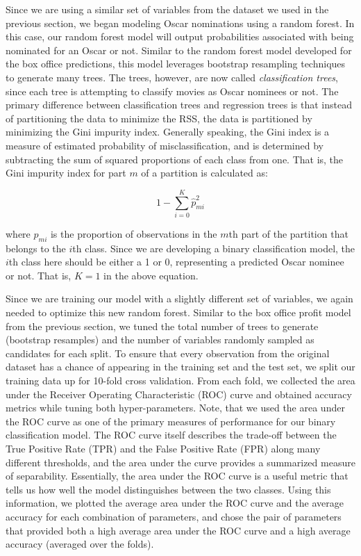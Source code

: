 \documentclass[10pt]{article}
\begin{document}
Since we are using a similar set of variables from the dataset we used in the previous section, we began modeling Oscar nominations using a random forest. In this case, our random forest model will output probabilities associated with being nominated for an Oscar or not. Similar to the random forest model developed for the box office predictions, this model leverages bootstrap resampling techniques to generate many trees. The trees, however, are now called \textit{classification trees}, since each tree is attempting to classify movies as Oscar nominees or not. The primary difference between classification trees and regression trees is that instead of partitioning the data to minimize the RSS, the data is partitioned by minimizing the Gini impurity index. Generally speaking, the Gini index is a measure of estimated probability of misclassification, and is determined by subtracting the sum of squared proportions of each class from one. That is, the Gini impurity index for part $m$ of a partition is calculated as:

$$1-\sum_{i=0}^{K} \hat{p}_{m i}^{2}$$

where $\hat{p}_{m i}$ is the proportion of observations in the $m$th part of the partition that belongs to the $i$th class. Since we are developing a binary classification model, the $i$th class here should be either a 1 or 0, representing a predicted Oscar nominee or not. That is, $K=1$ in the above equation. 

Since we are training our model with a slightly different set of variables, we again needed to optimize this new random forest. Similar to the box office profit model from the previous section, we tuned the total number of trees to generate (bootstrap resamples) and the number of variables randomly sampled as candidates for each split. To ensure that every observation from the original dataset has a chance of appearing in the training set and the test set, we split our training data up for 10-fold cross validation. From each fold, we collected the area under the Receiver Operating Characteristic (ROC) curve and obtained accuracy metrics while tuning both hyper-parameters. Note, that we used the area under the ROC curve as one of the primary measures of performance for our binary classification model. The ROC curve itself describes the trade-off between the True Positive Rate (TPR) and the False Positive Rate (FPR) along many different thresholds, and the area under the curve provides a summarized measure of separability. Essentially, the area under the ROC curve is a useful metric that tells us how well the model distinguishes between the two classes. Using this information, we plotted the average area under the ROC curve and the average accuracy for each combination of parameters, and chose the pair of parameters that provided both a high average area under the ROC curve and a high average accuracy (averaged over the folds). 
\end{document}
